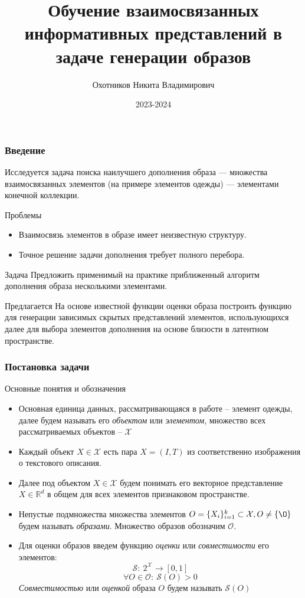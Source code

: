 \documentclass[10pt]{beamer}
\title[]{Обучение взаимосвязанных информативных представлений в задаче генерации образов}
\author{Охотников Никита Владимирович}
\institute{МФТИ}
\date{2023-2024}
\begin{document}
\begin{frame}
  \titlepage
\end{frame}


\begin{frame}
	\frametitle{Введение}
	Исследуется задача поиска наилучшего дополнения образа --- множества взаимосвязанных элементов (на примере элементов одежды) --- элементами конечной коллекции.
	\begin{block}{Проблемы}
		\begin{itemize}
			\item Взаимосвязь элементов в образе имеет неизвестную структуру.
			\item Точное решение задачи дополнения требует полного перебора.
		\end{itemize}
	\end{block}
	\vfill
	\begin{block}{Задача}
			Предложить применимый на практике приближенный алгоритм дополнения образа несколькими элементами.
	\end{block}	

	\vfill
	\begin{block}{Предлагается}
		На основе известной функции оценки образа построить функцию для генерации зависимых скрытых представлений элементов, использующихся далее для выбора элементов дополнения на основе близости в латентном пространстве.
	\end{block}	
\end{frame}


\begin{frame}
	\frametitle{Постановка задачи}
		\begin{block}{Основные понятия и обозначения}
			\begin{itemize}
				\item Основная единица данных, рассматривающаяся в работе -- элемент одежды, далее будем называть его \textit{объектом} или \textit{элементом}, множество всех рассматриваемых объектов -- $\mathcal{X}$
				
				\item Каждый объект $X\in\mathcal{X}$ есть пара $X = (I, T)$ из соответственно изображения о текстового описания.  
				\item Далее под объектом $X\in \mathcal{X}$ будем понимать его векторное представление $X\in\mathbb{R}^d$ в общем для всех элементов признаковом пространстве.								
				\item Непустые подмножества множества элементов $O = \{X_i\}_{i=1}^k\subset \mathcal{X}, O\neq\{\O\}$ будем называть \textit{образами}. Множество образов обозначим $\mathcal{O}$.
				\item Для оценки образов введем функцию \textit{оценки} или \textit{совместимости} его элементов: 
				$$\mathcal{S}:~2^\mathcal{X}\longrightarrow [0,1]$$
				$$\forall O \in \mathcal{O}:~\mathcal{S}(O) > 0$$
				\textit{Совместимостью} или \textit{оценкой} образа $O$ будем называть $\mathcal{S}(O)$
			\end{itemize}
		\end{block}					
\end{frame}
\end{document}
